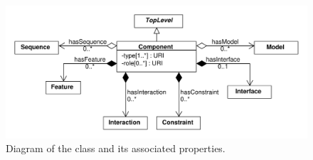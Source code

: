\begin{figure}[ht]
\begin{center}
\includegraphics[scale=0.6]{sbol_classes/component}
\caption[]{Diagram of the  class and its associated properties.}
\label{uml:component}
\end{center}
\end{figure} 

